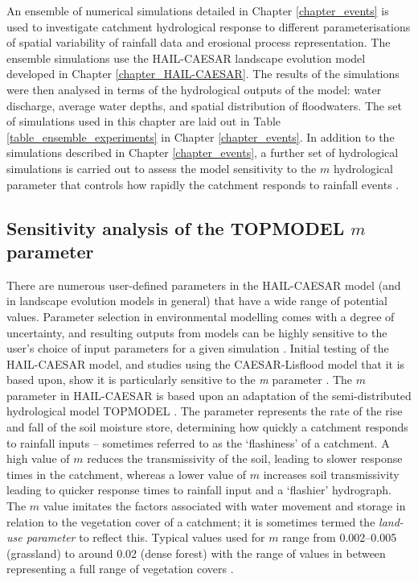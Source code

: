 An ensemble of numerical simulations detailed in Chapter \ref{chapter_events} is used to investigate catchment hydrological response to different parameterisations of spatial variability of rainfall data and erosional process representation. The ensemble simulations use the HAIL-CAESAR landscape evolution model developed in Chapter \ref{chapter_HAIL-CAESAR}. The results of the simulations were then analysed in terms of the hydrological outputs of the model: water discharge, average water depths, and spatial distribution of floodwaters. The set of simulations used in this chapter are laid out in Table \ref{table_ensemble_experiments} in Chapter \ref{chapter_events}. In addition to the simulations described in Chapter \ref{chapter_events}, a further set of hydrological simulations is carried out to assess the model sensitivity to the \(m\) hydrological parameter that controls how rapidly the catchment responds to rainfall events \citep{beven1979physically}.

\subsection{Sensitivity analysis of the TOPMODEL \(m\) parameter}
There are numerous user-defined parameters in the HAIL-CAESAR model (and in landscape evolution models in general) that have a wide range of potential values. Parameter selection in environmental modelling comes with a degree of uncertainty, and resulting outputs from models can be highly sensitive to the user's choice of input parameters for a given simulation \citep{Pelletier2012}. Initial testing of the HAIL-CAESAR model, and studies using the CAESAR-Lisflood model that it is based upon, show it is particularly sensitive to the \textit{m} parameter \citep{coulthard2002cellular,welsh2009testing}. The \(m\) parameter in HAIL-CAESAR is based upon an adaptation of the semi-distributed hydrological model TOPMODEL \citep{beven1979physically}. The parameter represents the rate of the rise and fall of the soil moisture store, determining how quickly a catchment responds to rainfall inputs -- sometimes referred to as the `flashiness' of a catchment. A high value of \(m\) reduces the transmissivity of the soil, leading to slower response times in the catchment, whereas a lower value of \(m\) increases soil transmissivity leading to quicker response times to rainfall input and a `flashier' hydrograph. The \(m\) value imitates the factors associated with water movement and storage in relation to the vegetation cover of a catchment; it is sometimes termed the \textit{land-use parameter} \citep{welsh2009testing} to reflect this. Typical values used for \(m\) range from 0.002--0.005 (grassland) to around 0.02 (dense forest) with the range of values in between representing a full range of vegetation covers \citep{beven1984testing,beven1997topmodel}.

